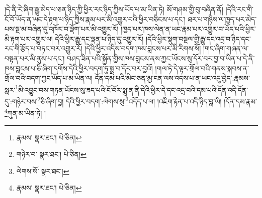 །དེ་ནི་རེ་ཞིག་རྒྱུ་མེད་པ་ཅན་ཉིད་ཀྱི་ཕྱིར་རང་ཉིད་ཀྱིས་ཡོད་པ་མ་ཡིན་ཏེ། མོ་གཤམ་གྱི་བུ་བཞིན་ནོ། །དེའི་རང་གི་ངོ་བོ་ཡོད་ན་ཡང་དེ་རྟག་པ་ཉིད་ཀྱིས་རྣམ་པར་མི་འགྱུར་བའི་ཕྱིར་བཅིངས་པ་དང་། ཐར་པ་གཉིས་ལ་ཁྱད་པར་མེད་པས་སྔ་མ་བཞིན་དུ་འཁོར་བ་ལྡོག་པར་མི་འགྱུར་རོ། །ཁྱད་པར་ཁས་ལེན་ན་ཡང་རྣམ་པར་འགྱུར་བ་ཡོད་པའི་ཕྱིར་མི་རྟག་པར་འགྱུར་ལ། དེའི་ཕྱིར་རྒྱུ་དང་ལྡན་པ་ཉིད་དུ་འགྱུར་རོ། །དེའི་ཕྱིར་སྡུག་བསྔལ་གྱི་རྒྱུ་དང་འདྲ་བ་ཉིད་དང་རང་གི་རྩོད་པ་བཏང་བར་འགྱུར་རོ། །དེའི་ཕྱིར་འདིས་བདག་ཁས་བླངས་པར་མི་རིགས་སོ། །གང་ཞིག་གཞན་ལ་བསྟན་པར་མི་ནུས་པ་དང་། བཤད་ཟིན་པའི་སྐྱོན་གྱིས་ཁས་བླངས་ནས་ཀྱང་ཡོངས་སུ་དོར་བར་བྱ་བ་ཡིན་པ་དེ་ནི་ཁས་བླངས་པ་ཅི་ཞིག་དགོས་དེའི་ཕྱིར་བདག་ཏུ་སྨྲ་བ་དོར་བར་བྱའོ། །གལ་ཏེ་དེ་ལྟར་གྲོལ་བའི་གནས་སྐབས་ན་གྲོལ་བའི་བདག་ཀྱང་ཡོད་པ་མ་ཡིན་ལ། དོན་དམ་པའི་མིང་ཅན་མྱ་ངན་ལས་འདས་པ་ན་ཡང་འདུ་བྱེད་:རྣམས་སླར་\footnote{རྣམས་  སྣར་ཐང་།  པེ་ཅིན། }མི་འབྱུང་བས་གཏན་ཡོངས་སུ་ཟད་པའི་ངོ་བོར་སྨྲ་ན་ནི་དེའི་ཕྱིར་དེ་དང་འདྲ་བའི་དམ་པའི་དོན་འདི་དོན་དུ་:གཉེར་བས་\footnote{གཉེར་བ་  སྣར་ཐང་།  པེ་ཅིན། }ཅི་ཞིག་བྱ། དེའི་ཕྱིར་བདག་:ལེགས་སུ་\footnote{ལེགས་སོ་  སྣར་ཐང་། }འདོད་པ་ལ། །འཇིག་རྟེན་པ་འདི་ཉིད་བླ་ཡི། །དོན་དམ་རྣམ་\footnote{རྣམས་  སྣར་ཐང་།  པེ་ཅིན། }ཀུན་མ་ཡིན་ཏེ། །
